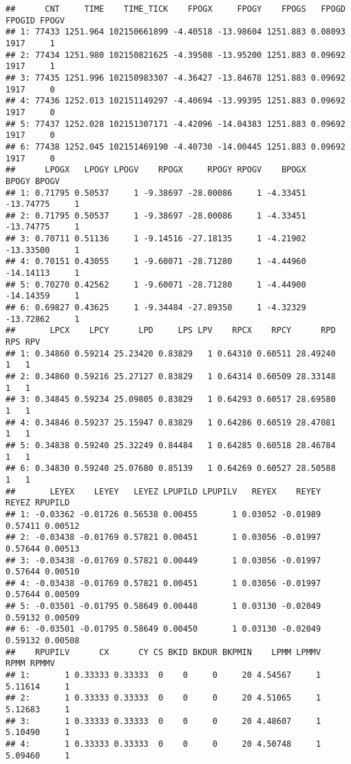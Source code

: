 \documentclass[
]{article}
\begin{document}
\begin{verbatim}
##      CNT     TIME    TIME_TICK    FPOGX     FPOGY    FPOGS   FPOGD FPOGID FPOGV
## 1: 77433 1251.964 102150661899 -4.40518 -13.98604 1251.883 0.08093   1917     1
## 2: 77434 1251.980 102150821625 -4.39508 -13.95200 1251.883 0.09692   1917     1
## 3: 77435 1251.996 102150983307 -4.36427 -13.84678 1251.883 0.09692   1917     0
## 4: 77436 1252.013 102151149297 -4.40694 -13.99395 1251.883 0.09692   1917     0
## 5: 77437 1252.028 102151307171 -4.42096 -14.04383 1251.883 0.09692   1917     0
## 6: 77438 1252.045 102151469190 -4.40730 -14.00445 1251.883 0.09692   1917     0
##      LPOGX   LPOGY LPOGV    RPOGX     RPOGY RPOGV    BPOGX     BPOGY BPOGV
## 1: 0.71795 0.50537     1 -9.38697 -28.00086     1 -4.33451 -13.74775     1
## 2: 0.71795 0.50537     1 -9.38697 -28.00086     1 -4.33451 -13.74775     1
## 3: 0.70711 0.51136     1 -9.14516 -27.18135     1 -4.21902 -13.33500     1
## 4: 0.70151 0.43055     1 -9.60071 -28.71280     1 -4.44960 -14.14113     1
## 5: 0.70270 0.42562     1 -9.60071 -28.71280     1 -4.44900 -14.14359     1
## 6: 0.69827 0.43625     1 -9.34484 -27.89350     1 -4.32329 -13.72862     1
##       LPCX    LPCY      LPD     LPS LPV    RPCX    RPCY      RPD RPS RPV
## 1: 0.34860 0.59214 25.23420 0.83829   1 0.64310 0.60511 28.49240   1   1
## 2: 0.34860 0.59216 25.27127 0.83829   1 0.64314 0.60509 28.33148   1   1
## 3: 0.34845 0.59234 25.09805 0.83829   1 0.64293 0.60517 28.69580   1   1
## 4: 0.34846 0.59237 25.15947 0.83829   1 0.64286 0.60519 28.47081   1   1
## 5: 0.34838 0.59240 25.32249 0.84484   1 0.64285 0.60518 28.46784   1   1
## 6: 0.34830 0.59240 25.07680 0.85139   1 0.64269 0.60527 28.50588   1   1
##       LEYEX    LEYEY   LEYEZ LPUPILD LPUPILV   REYEX    REYEY   REYEZ RPUPILD
## 1: -0.03362 -0.01726 0.56538 0.00455       1 0.03052 -0.01989 0.57411 0.00512
## 2: -0.03438 -0.01769 0.57821 0.00451       1 0.03056 -0.01997 0.57644 0.00513
## 3: -0.03438 -0.01769 0.57821 0.00449       1 0.03056 -0.01997 0.57644 0.00510
## 4: -0.03438 -0.01769 0.57821 0.00451       1 0.03056 -0.01997 0.57644 0.00509
## 5: -0.03501 -0.01795 0.58649 0.00448       1 0.03130 -0.02049 0.59132 0.00509
## 6: -0.03501 -0.01795 0.58649 0.00450       1 0.03130 -0.02049 0.59132 0.00508
##    RPUPILV      CX      CY CS BKID BKDUR BKPMIN    LPMM LPMMV    RPMM RPMMV
## 1:       1 0.33333 0.33333  0    0     0     20 4.54567     1 5.11614     1
## 2:       1 0.33333 0.33333  0    0     0     20 4.51065     1 5.12683     1
## 3:       1 0.33333 0.33333  0    0     0     20 4.48607     1 5.10490     1
## 4:       1 0.33333 0.33333  0    0     0     20 4.50748     1 5.09460     1

\end{verbatim}
\end{document}
